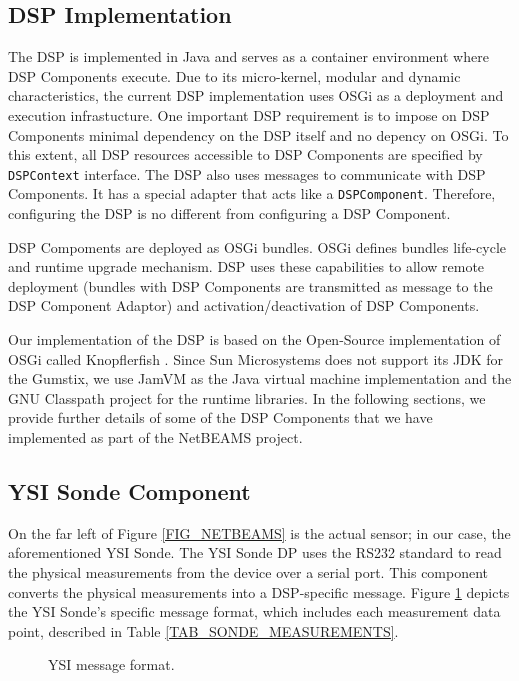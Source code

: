 \documentclass[conference]{IEEEtran}
\begin{document}
\subsection{DSP Implementation}

The DSP is implemented in Java and serves as a container environment where 
DSP Components execute. Due to its micro-kernel, modular and dynamic characteristics, 
the current DSP implementation uses OSGi \cite{osgi} as a deployment and execution 
infrastucture. One important DSP requirement is to impose on DSP Components minimal 
dependency on the DSP itself and no depency on OSGi. To this extent, all DSP resources
accessible to DSP Components are specified by \texttt{DSPContext} interface.
The DSP also uses messages to communicate with DSP Components. It has a special adapter
that acts like a \texttt{DSPComponent}. Therefore, configuring the DSP is no different from configuring
a DSP Component.

DSP Compoments are deployed as OSGi bundles. OSGi defines bundles life-cycle and
runtime upgrade mechanism. DSP uses these capabilities to allow remote deployment 
(bundles with DSP Components are transmitted as message to the DSP Component Adaptor) 
and activation/deactivation of DSP Components. 

Our implementation of the DSP is based on the Open-Source
implementation of OSGi called Knopflerfish \cite{knopflerfish01}.
Since Sun Microsystems does not support its JDK for the Gumstix, we
use JamVM \cite{jamvm01} as the Java virtual machine implementation
and the GNU Classpath \cite{classpath01} project for the runtime libraries. In
the following sections, we provide further details of some of the DSP
Components that we have implemented as part of the NetBEAMS project.

\subsection{YSI Sonde Component}

On the far left of Figure \ref{FIG_NETBEAMS} is the actual sensor; in
our case, the aforementioned YSI Sonde. The YSI Sonde DP 
uses the RS232 standard to read the physical measurements from the
device over a serial port.  This component converts the physical
measurements into a DSP-specific message. Figure
\ref{FIG_DSP_YSI_DATA} depicts the YSI Sonde's specific message format, 
which includes each measurement data point, described in Table
\ref{TAB_SONDE_MEASUREMENTS}.

\begin{figure}[!htb]
\centering
{}
\caption{\label{FIG_DSP_YSI_DATA} YSI message format.}
\end{figure}
\end{document}
